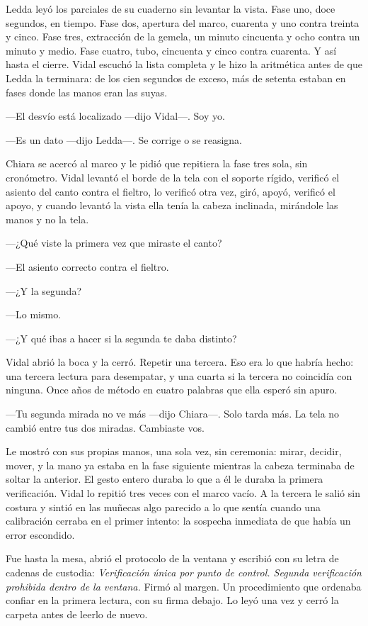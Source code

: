 Ledda leyó los parciales de su cuaderno sin levantar la vista. Fase uno, doce segundos, en tiempo. Fase dos, apertura del marco, cuarenta y uno contra treinta y cinco. Fase tres, extracción de la gemela, un minuto cincuenta y ocho contra un minuto y medio. Fase cuatro, tubo, cincuenta y cinco contra cuarenta. Y así hasta el cierre. Vidal escuchó la lista completa y le hizo la aritmética antes de que Ledda la terminara: de los cien segundos de exceso, más de setenta estaban en fases donde las manos eran las suyas.

---El desvío está localizado ---dijo Vidal---. Soy yo.

---Es un dato ---dijo Ledda---. Se corrige o se reasigna.

Chiara se acercó al marco y le pidió que repitiera la fase tres sola, sin cronómetro. Vidal levantó el borde de la tela con el soporte rígido, verificó el asiento del canto contra el fieltro, lo verificó otra vez, giró, apoyó, verificó el apoyo, y cuando levantó la vista ella tenía la cabeza inclinada, mirándole las manos y no la tela.

---¿Qué viste la primera vez que miraste el canto?

---El asiento correcto contra el fieltro.

---¿Y la segunda?

---Lo mismo.

---¿Y qué ibas a hacer si la segunda te daba distinto?

Vidal abrió la boca y la cerró. Repetir una tercera. Eso era lo que habría hecho: una tercera lectura para desempatar, y una cuarta si la tercera no coincidía con ninguna. Once años de método en cuatro palabras que ella esperó sin apuro.

---Tu segunda mirada no ve más ---dijo Chiara---. Solo tarda más. La tela no cambió entre tus dos miradas. Cambiaste vos.

Le mostró con sus propias manos, una sola vez, sin ceremonia: mirar, decidir, mover, y la mano ya estaba en la fase siguiente mientras la cabeza terminaba de soltar la anterior. El gesto entero duraba lo que a él le duraba la primera verificación. Vidal lo repitió tres veces con el marco vacío. A la tercera le salió sin costura y sintió en las muñecas algo parecido a lo que sentía cuando una calibración cerraba en el primer intento: la sospecha inmediata de que había un error escondido.

Fue hasta la mesa, abrió el protocolo de la ventana y escribió con su letra de cadenas de custodia: \textit{Verificación única por punto de control. Segunda verificación prohibida dentro de la ventana.} Firmó al margen. Un procedimiento que ordenaba confiar en la primera lectura, con su firma debajo. Lo leyó una vez y cerró la carpeta antes de leerlo de nuevo.

